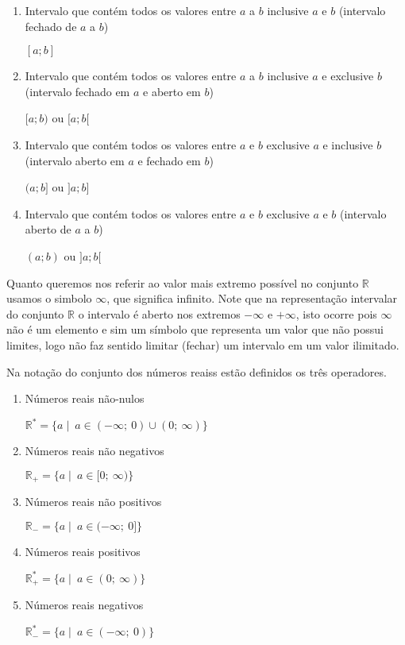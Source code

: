 \documentclass[]{book}
\begin{document}
\begin{enumerate}
\def\labelenumi{\arabic{enumi}.}
\item
  Intervalo que contém todos os valores entre \(a\) a \(b\) inclusive
  \(a\) e \(b\) (intervalo fechado de \(a\) a \(b\))

  \([a; b]\)
\item
  Intervalo que contém todos os valores entre \(a\) a \(b\) inclusive
  \(a\) e exclusive \(b\) (intervalo fechado em \(a\) e aberto em \(b\))

  \([a; b)\) ou \([a; b[\)
\item
  Intervalo que contém todos os valores entre \(a\) e \(b\) exclusive
  \(a\) e inclusive \(b\) (intervalo aberto em \(a\) e fechado em \(b\))

  \((a; b]\) ou \(]a; b]\)
\item
  Intervalo que contém todos os valores entre \(a\) e \(b\) exclusive
  \(a\) e \(b\) (intervalo aberto de \(a\) a \(b\))

  \((a; b)\) ou \(]a; b[\)
\end{enumerate}

Quanto queremos nos referir ao valor mais extremo possível no conjunto
\(\mathbb{R}\) usamos o simbolo \(\infty\), que significa infinito. Note
que na representação intervalar do conjunto \(\mathbb{R}\) o intervalo é
aberto nos extremos \(-\infty\) e \(+\infty\), isto ocorre pois
\(\infty\) não é um elemento e sim um símbolo que representa um valor
que não possui limites, logo não faz sentido limitar (fechar) um
intervalo em um valor ilimitado.

Na notação do conjunto dos números reaiss estão definidos os três
operadores.

\begin{enumerate}
\def\labelenumi{\arabic{enumi}.}
\item
  Números reais não-nulos

  \(\mathbb{R}^{*} = \{ a \mid \ a \in (-\infty;\ 0) \cup (0;\ \infty) \}\)
\item
  Números reais não negativos

  \(\mathbb{R}_{+} = \{a \mid \ a \in [0; \ \infty) \}\)
\item
  Números reais não positivos

  \(\mathbb{R}_{-} = \{a \mid \ a \in (-\infty;\ 0] \}\)
\item
  Números reais positivos

  \(\mathbb{R}_{+}^{*} = \{a \mid \ a \in (0;\ \infty) \}\)
\item
  Números reais negativos

  \(\mathbb{R}_{-}^{*} = \{a \mid \ a \in (-\infty;\ 0) \}\)
\end{enumerate}
\end{document}
